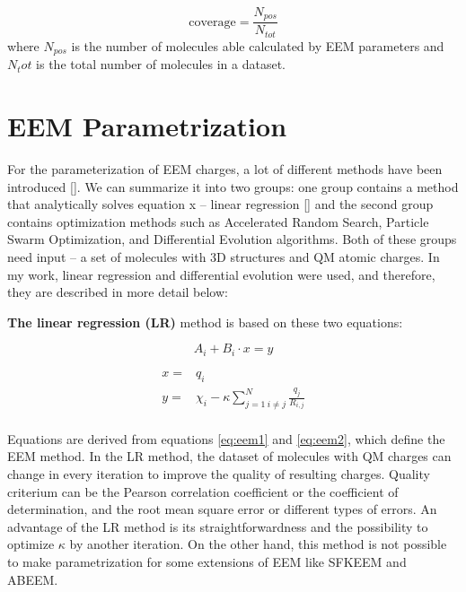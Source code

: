 \begin{equation}
    \mathrm{coverage} = \frac{N_{pos}}{N_{tot}}
\end{equation}
where $N_{pos}$ is the number of molecules able calculated by EEM parameters
and $N_tot$ is the total number of molecules in a dataset.

\section{EEM Parametrization}

For the parameterization of EEM charges, a lot of different methods have been
introduced []. We can summarize it into two groups: one group contains
a method that analytically solves equation x -- linear regression [] and the
second group contains optimization methods \cite{Ouyang2009}  such as
Accelerated Random Search, Particle Swarm Optimization, and Differential
Evolution algorithms. Both of these groups need input -- a set of molecules
with 3D structures and QM atomic charges. In my work, linear regression and
differential evolution were used, and therefore, they are described in more
detail below:

\textbf{The linear regression (LR)} method is based on these two equations:

\begin{equation}
    A_i + B_i \cdot x = y
\end{equation}

\begin{equation}
    \begin{array}{cc}
    x =& q_i \\
    y =& \chi_i - \kappa \sum^N_{j=1 \: i\neq{j}} \frac{q_j}{R_{i,j}} \\
    \end{array}
\end{equation}

Equations are derived from equations \ref{eq:eem1} and \ref{eq:eem2}, which
define the EEM method. In the LR method, the dataset of molecules with QM
charges can change in every iteration to improve the quality of resulting
charges. Quality criterium can be the Pearson correlation coefficient or
the coefficient of determination, and the root mean square error or different
types of errors.  An advantage of the LR method is its straightforwardness and
the possibility to optimize $\kappa$ by another iteration. On the other hand,
this method is not possible to make parametrization for some extensions of EEM
like SFKEEM and ABEEM.

